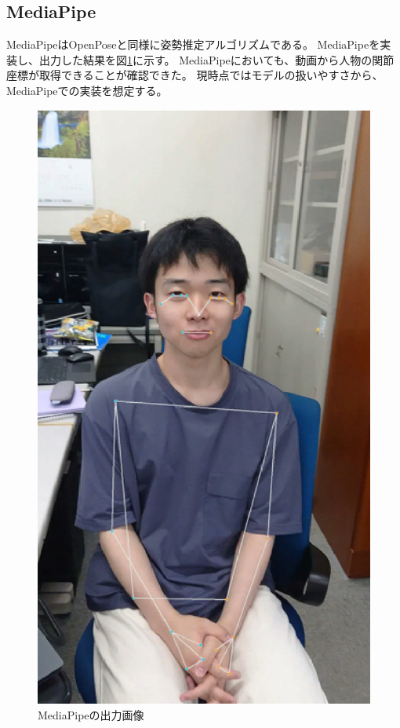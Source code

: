 \subsection{MediaPipe}
MediaPipe\cite{MediaPipe}はOpenPoseと同様に姿勢推定アルゴリズムである。
MediaPipeを実装し、出力した結果を図\ref{fig:mediapipe}に示す。
MediaPipeにおいても、動画から人物の関節座標が取得できることが確認できた。
現時点ではモデルの扱いやすさから、MediaPipeでの実装を想定する。
\begin{figure}[H]
    \centering
    \includegraphics[scale=0.2]{./fig/mediapipe.eps}
    \caption{MediaPipeの出力画像}
    \label{fig:mediapipe}
\end{figure}
\vspace{-1.2mm}
